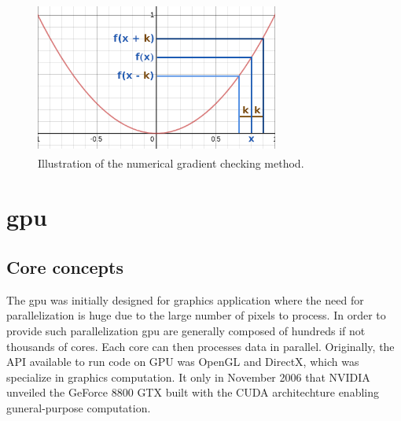 \documentclass[11pt]{report}
\begin{document}
\begin{figure}[h]
\centering
\includegraphics[width=8cm, height=5cm]{gradient_checking}
\caption{Illustration of the numerical gradient checking method.}
\label{fig:gradient_checking}
\end{figure}

\section{\acrlong{gpu}}

\subsection{Core concepts} \label{sec:core_concepts}

The \acrshort{gpu} was initially designed for graphics application where the need for parallelization is huge due to the large number of pixels to process. In order to provide such parallelization \acrshort{gpu} are generally composed of hundreds if not thousands of cores. Each core can then processes data in parallel. Originally, the API available to run code on GPU was OpenGL and DirectX, which was specialize in graphics computation. It only in November 2006 that NVIDIA unveiled the GeForce 8800 GTX built with the CUDA architechture enabling guneral-purpose computation.
\\
\end{document}
